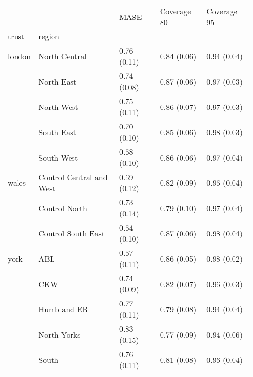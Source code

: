\begin{tabular}{lllll}
\toprule
     &       &         MASE &  Coverage 80 &  Coverage 95 \\
trust & region &              &              &              \\
\midrule
london & North Central &  0.76 (0.11) &  0.84 (0.06) &  0.94 (0.04) \\
     & North East &  0.74 (0.08) &  0.87 (0.06) &  0.97 (0.03) \\
     & North West &  0.75 (0.11) &  0.86 (0.07) &  0.97 (0.03) \\
     & South East &  0.70 (0.10) &  0.85 (0.06) &  0.98 (0.03) \\
     & South West &  0.68 (0.10) &  0.86 (0.06) &  0.97 (0.04) \\
wales & Control Central and West &  0.69 (0.12) &  0.82 (0.09) &  0.96 (0.04) \\
     & Control North &  0.73 (0.14) &  0.79 (0.10) &  0.97 (0.04) \\
     & Control South East &  0.64 (0.10) &  0.87 (0.06) &  0.98 (0.04) \\
york & ABL &  0.67 (0.11) &  0.86 (0.05) &  0.98 (0.02) \\
     & CKW &  0.74 (0.09) &  0.82 (0.07) &  0.96 (0.03) \\
     & Humb and ER &  0.77 (0.11) &  0.79 (0.08) &  0.94 (0.04) \\
     & North Yorks &  0.83 (0.15) &  0.77 (0.09) &  0.94 (0.06) \\
     & South &  0.76 (0.11) &  0.81 (0.08) &  0.96 (0.04) \\
\bottomrule
\end{tabular}
